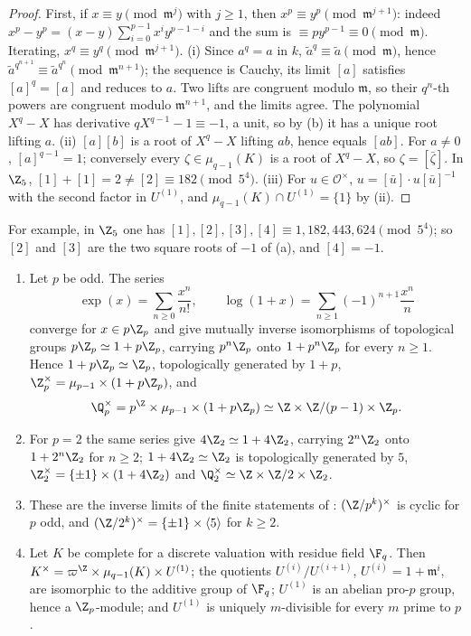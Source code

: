 \begin{proof}
First, if $x\equiv y\pmod{\mathfrak m^j}$ with $j\ge1$, then $x^p\equiv y^p\pmod{\mathfrak m^{j+1}}$: indeed $x^p-y^p=(x-y)\sum_{i=0}^{p-1}x^iy^{p-1-i}$ and
the sum is $\equiv py^{p-1}\equiv0\pmod{\mathfrak m}$. Iterating, $x^q\equiv y^q\pmod{\mathfrak m^{j+1}}$. (i) Since $a^q=a$ in $k$, $\tilde a^q\equiv\tilde a
\pmod{\mathfrak m}$, hence $\tilde a^{q^{n+1}}\equiv\tilde a^{q^n}\pmod{\mathfrak m^{n+1}}$; the sequence is Cauchy, its limit $[a]$ satisfies $[a]^q=[a]$ and
reduces to $a$. Two lifts are congruent modulo $\mathfrak m$, so their $q^n$-th powers are congruent modulo $\mathfrak m^{n+1}$, and the limits agree.
The polynomial $X^q-X$ has derivative $qX^{q-1}-1\equiv-1$, a unit, so by (b) it has a unique root lifting $a$.
(ii) $[a][b]$ is a root of $X^q-X$ lifting $ab$, hence equals $[ab]$. For $a\ne0$, $[a]^{q-1}=1$; conversely every $\zeta\in\mu_{q-1}(K)$ is a root
of $X^q-X$, so $\zeta=[\bar\zeta]$. In $\Z_5$, $[1]+[1]=2\ne[2]\equiv182\pmod{5^4}$. (iii) For $u\in\mathcal O^\times$, $u=[\bar u]\cdot u[\bar u]^{-1}$ with the
second factor in $U^{(1)}$, and $\mu_{q-1}(K)\cap U^{(1)}=\{1\}$ by (ii).
\end{proof}

For example, in $\Z_5$ one has $[1],[2],[3],[4]\equiv1,182,443,624\pmod{5^4}$; so $[2]$ and $[3]$ are the two square roots of $-1$ of
(a), and $[4]=-1$.

\begin{theorem}\label{thm:local:units-structure}
\begin{enumerate}[label=(\roman*)]
\item Let $p$ be odd. The series
\[
\exp(x)=\sum_{n\ge0}\frac{x^n}{n!},\qquad\log(1+x)=\sum_{n\ge1}(-1)^{n+1}\frac{x^n}n
\]
converge for $x\in p\Z_p$ and give mutually inverse isomorphisms of topological groups $p\Z_p\simeq1+p\Z_p$, carrying $p^n\Z_p$ onto $1+p^n\Z_p$
for every $n\ge1$. Hence $1+p\Z_p\simeq\Z_p$, topologically generated by $1+p$, $\Z_p^\times=\mu_{p-1}\times(1+p\Z_p)$, and
\[
\Q_p^\times=p^{\Z}\times\mu_{p-1}\times(1+p\Z_p)\simeq\Z\times\Z/(p-1)\times\Z_p .
\]
\item For $p=2$ the same series give $4\Z_2\simeq1+4\Z_2$, carrying $2^n\Z_2$ onto $1+2^n\Z_2$ for $n\ge2$; $1+4\Z_2\simeq\Z_2$ is topologically
generated by $5$, $\Z_2^\times=\{\pm1\}\times(1+4\Z_2)$ and $\Q_2^\times\simeq\Z\times\Z/2\times\Z_2$.
\item These are the inverse limits of the finite statements of : $(\Z/p^k)^\times$ is cyclic for $p$ odd, and
$(\Z/2^k)^\times=\{\pm1\}\times\langle5\rangle$ for $k\ge2$.
\item Let $K$ be complete for a discrete valuation with residue field $\F_q$. Then $K^\times=\varpi^{\Z}\times\mu_{q-1}(K)\times U^{(1)}$; the
quotients $U^{(i)}/U^{(i+1)}$, $U^{(i)}=1+\mathfrak m^i$, are isomorphic to the additive group of $\F_q$; $U^{(1)}$ is an abelian pro-$p$ group,
hence a $\Z_p$-module; and $U^{(1)}$ is uniquely $m$-divisible for every $m$ prime to $p$.
\end{enumerate}
\end{theorem}


